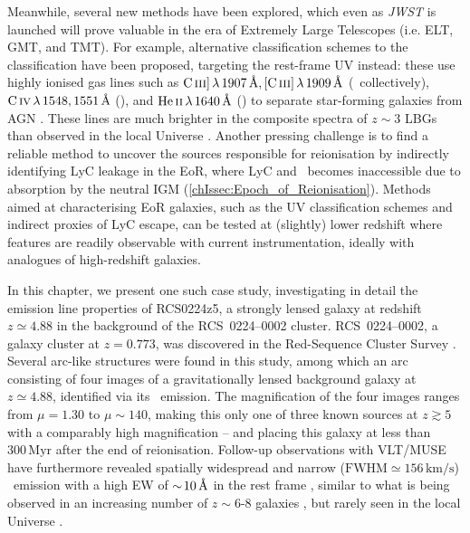 Meanwhile, several new methods have been explored, which even as \textit{JWST} is launched will prove valuable in the era of Extremely Large Telescopes (i.e. ELT, GMT, and TMT). For example, alternative classification schemes to the  classification have been proposed, targeting the rest-frame UV instead: these use highly ionised gas lines such as $\CIIIs \, \lambda \, 1907 \, \Angstrom, \CIIIf \, \lambda \, 1909 \, \Angstrom$ (\CIII\ collectively), $\CIV \, \lambda \, 1548, 1551 \, \Angstrom$ (\CIV), and $\HeII \, \lambda \, 1640 \, \Angstrom$ (\HeII) to separate star-forming galaxies from AGN \citep[e.g.][]{2016MNRAS.456.3354F}. These lines are much brighter in the composite spectra of $z \sim 3$ LBGs than observed in the local Universe \citep[e.g.][]{2003ApJ...588...65S}. Another pressing challenge is to find a reliable method to uncover the sources responsible for reionisation by indirectly identifying LyC leakage in the EoR, where LyC and  \lya\ becomes inaccessible due to absorption by the neutral IGM (\cref{chIssec:Epoch_of_Reionisation}). Methods aimed at characterising EoR galaxies, such as the UV classification schemes and indirect proxies of LyC escape, can be tested at (slightly) lower redshift where features are readily observable with current instrumentation, ideally with analogues of high-redshift galaxies.

In this chapter, we present one such case study, investigating in detail the emission line properties of RCS0224z5, a strongly lensed galaxy at redshift $z \simeq 4.88$ in the background of the RCS~0224--0002 cluster. RCS~0224--0002, a galaxy cluster at $z=0.773$, was discovered in the Red-Sequence Cluster Survey \citep[RCS;][]{2002AJ....123....1G}. Several arc-like structures were found in this study, among which an arc consisting of four images of a gravitationally lensed background galaxy at $z \simeq 4.88$, identified via its \lya\ emission. The magnification of the four images ranges from $\mu = 1.30$ to $\mu \sim 140$, making this only one of three known sources at $z \gtrsim 5$ with a comparably high magnification \citep{1997ApJ...486L..75F, 2009MNRAS.400.1121S, 2021ApJ...906..107K} -- and placing this galaxy at less than $300 \, \mathrm{Myr}$ after the end of reionisation. Follow-up observations with VLT/MUSE have furthermore revealed spatially widespread and narrow ($\text{FWHM} \simeq 156 \, \mathrm{km/s}$) \CIV\ emission with a high EW of $\sim \! 10 \, \text{\AA}$ in the rest frame \citep{2017MNRAS.467.3306S}, similar to what is being observed in an increasing number of $z \sim 6$-$8$ galaxies \citep{2015MNRAS.454.1393S, 2017ApJ...836L..14M, 2017ApJ...851...40L}, but rarely seen in the local Universe \citep{2019ApJ...874...93B, 2019MNRAS.488.3492S}.

